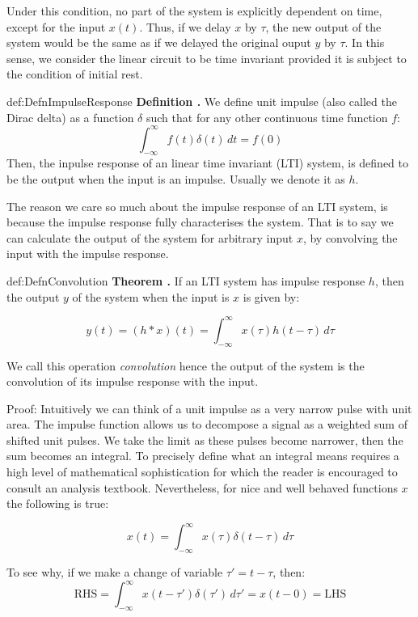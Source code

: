 \documentclass[14pt,a5paper,twoside]{book}
\newenvironment{myTheorem}[2]{ \begin{Theorem}[adjusted title=#1]{}{#2} 
  \textbf{Theorem \thetcbcounter.} \label{#2}}{\end{Theorem}}
\newenvironment{myDefinition}[2]{ \begin{Definition}[adjusted title=#1]{}{#2} 
  \textbf{Definition \thetcbcounter.} \label{#2}}{\end{Definition}}
\begin{document}
Under this condition, no part of the system is explicitly dependent on time, except for the input $x(t)$. Thus, if we delay $x$ by $\tau$, the new output of the system would be the same as if we delayed the original ouput $y$ by $\tau$. In this sense, we consider the linear circuit to be time invariant provided it is subject to the condition of initial rest.

\begin{myDefinition}{Unit Impulse and Impulse Response}{def:DefnImpulseResponse}
We define unit impulse (also called the Dirac delta) as a function $\delta$ such that for any other continuous time function $f$:
$$
\int^{\infty}_{-\infty} f(t) \delta(t)\,dt = f(0)
$$
Then, the inpulse response of an linear time invariant (LTI) system, is defined to be the output when the input is an impulse. Usually we denote it as $h$.
\end{myDefinition}

The reason we care so much about the impulse response of an LTI system, is because the impulse response fully characterises the system. That is to say we can calculate the output of the system for arbitrary input $x$, by convolving the input with the impulse response.
\begin{myTheorem}{Convolution Formula}{def:DefnConvolution}
If an LTI system has impulse response $h$, then the output $y$ of the system when the input is $x$ is given by:

$$
y(t) = (h*x)(t) = \int_{-\infty}^{\infty} x(\tau) h(t-\tau)\,d\tau
$$

We call this operation \emph{convolution} hence the output of the system is the convolution of its impulse response with the input.
\end{myTheorem}
Proof: Intuitively we can think of a unit impulse as a very narrow pulse with unit area. The impulse function allows us to decompose a signal as a weighted sum of shifted unit pulses. We take the limit as these pulses become narrower, then the sum becomes an integral. To precisely define what an integral means requires a high level of mathematical sophistication for which the reader is encouraged to consult an analysis textbook. Nevertheless, for nice and well behaved functions $x$ the following is true:

$$
x(t) = \int_{-\infty}^{\infty} x(\tau)\delta(t-\tau)\,d\tau
$$

To see why, if we make a change of variable $\tau' = t - \tau$, then:
$$\mathrm{RHS} = \int_{-\infty}^{\infty} x(t-\tau')\delta(\tau')\,d\tau' = x(t-0) = \mathrm{LHS}$$
\end{document}

